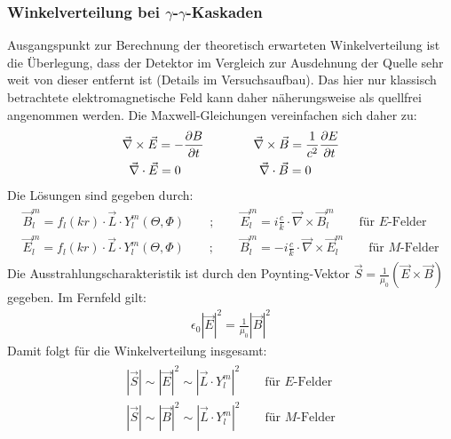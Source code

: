 \subsubsection{Winkelverteilung bei $\gamma$-$\gamma$-Kaskaden}

Ausgangspunkt zur Berechnung der theoretisch erwarteten Winkelverteilung ist die Überlegung, dass der Detektor im Vergleich zur Ausdehnung der Quelle sehr weit von dieser entfernt ist (Details im Versuchsaufbau). Das hier nur klassisch betrachtete elektromagnetische Feld kann daher näherungsweise als quellfrei angenommen werden. Die Maxwell-Gleichungen vereinfachen sich daher zu:
\begin{align}
	\begin{split}
		\vec{\nabla}\times\vec{E}=-\frac{\partial B}{\partial t}\qquad\qquad \vec{\nabla}\times\vec{B}=\frac{1}{c^2}\frac{\partial E}{\partial t}\\\vspace{0,2cm}
		\vec{\nabla}\cdot\vec{E}=0 \,\,\qquad\qquad\qquad\vec{\nabla}\cdot\vec{B}=0\qquad\;
	\end{split}
\end{align}
Die Lösungen sind gegeben durch:
\begin{align}
	\begin{split}
		\vec{B}^m_l= f_l(kr)\cdot\vec{L}\cdot Y^m_l(\Theta,\Phi)\qquad ; \qquad \vec{E}^m_l = i \frac{c}{k} \cdot\vec{\nabla}\times \vec{B}^m_l\qquad\text{für $E$-Felder}\\
		\vec{E}^m_l= f_l(kr)\cdot\vec{L}\cdot Y^m_l(\Theta,\Phi)\qquad ; \qquad \vec{B}^m_l = -i \frac{c}{k} \cdot\vec{\nabla}\times \vec{E}^m_l\qquad\text{für $M$-Felder}
	\end{split}
\end{align}
Die Ausstrahlungscharakteristik ist durch den Poynting-Vektor $\vec{S}=\frac{1}{\mu_0}\left( \vec{E}\times\vec{B}\right) $ gegeben. Im Fernfeld gilt:
\begin{align}
	\epsilon_0\left| \vec{E}\right| ^2=\frac{1}{\mu_0}\left| \vec{B}\right| ^2
\end{align}
Damit folgt für die Winkelverteilung insgesamt:
\begin{align}
\begin{split}
\left|\vec{S} \right| \sim \left| \vec{E}\right|^2 \sim \left| \vec{L}\cdot Y^m_l\right|^2\qquad\text{für $E$-Felder}\\
\left|\vec{S} \right| \sim \left| \vec{B}\right|^2 \sim \left| \vec{L}\cdot Y^m_l\right|^2\qquad\text{für $M$-Felder}
\end{split}
\end{align}
